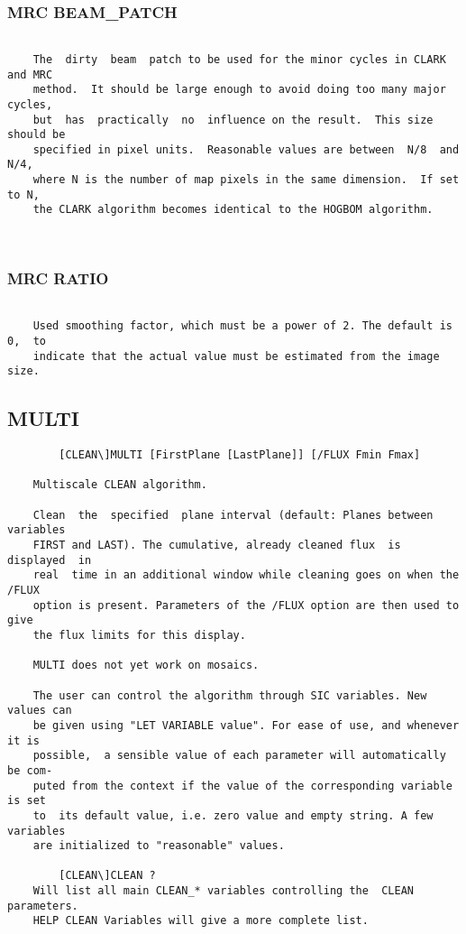 \subsubsection{MRC BEAM\_PATCH}
\begin{verbatim}

    The  dirty  beam  patch to be used for the minor cycles in CLARK and MRC
    method.  It should be large enough to avoid doing too many major cycles,
    but  has  practically  no  influence on the result.  This size should be
    specified in pixel units.  Reasonable values are between  N/8  and  N/4,
    where N is the number of map pixels in the same dimension.  If set to N,
    the CLARK algorithm becomes identical to the HOGBOM algorithm.



\end{verbatim}
\subsubsection{MRC RATIO}
\begin{verbatim}

    Used smoothing factor, which must be a power of 2. The default is 0,  to
    indicate that the actual value must be estimated from the image size.

\end{verbatim}
\subsection{MULTI}
\begin{verbatim}
        [CLEAN\]MULTI [FirstPlane [LastPlane]] [/FLUX Fmin Fmax]

    Multiscale CLEAN algorithm.

    Clean  the  specified  plane interval (default: Planes between variables
    FIRST and LAST). The cumulative, already cleaned flux  is  displayed  in
    real  time in an additional window while cleaning goes on when the /FLUX
    option is present. Parameters of the /FLUX option are then used to  give
    the flux limits for this display.

    MULTI does not yet work on mosaics.

    The user can control the algorithm through SIC variables. New values can
    be given using "LET VARIABLE value". For ease of use, and whenever it is
    possible,  a sensible value of each parameter will automatically be com-
    puted from the context if the value of the corresponding variable is set
    to  its default value, i.e. zero value and empty string. A few variables
    are initialized to "reasonable" values.

        [CLEAN\]CLEAN ?
    Will list all main CLEAN_* variables controlling the  CLEAN  parameters.
    HELP CLEAN Variables will give a more complete list.
\end{verbatim}
